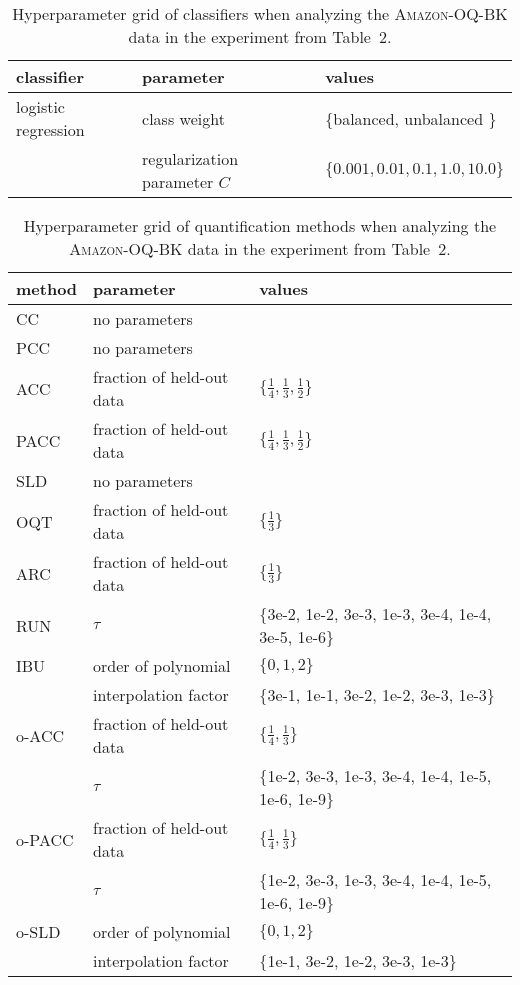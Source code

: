 \documentclass[10pt,a4paper]{article}
\begin{document}
\begin{table}
 \centering
 \caption{Hyperparameter grid of classifiers when analyzing the
 \textsc{Amazon-OQ-BK} data in the experiment from Table~2.}
 \label{tab:hyperparameter-roberta-classifier}
 \footnotesize
 \begin{tabular}{lll}
 \toprule
 classifier & parameter & values \\
 \midrule
 logistic regression & class weight & \{balanced, unbalanced \} \\
 & regularization parameter $C$ & $\{0.001, 0.01, 0.1, 1.0, 10.0\}$ \\
 \bottomrule
 \end{tabular}
\end{table}

\begin{table}
 \centering
 \caption{Hyperparameter grid of quantification methods when
 analyzing the \textsc{Amazon-OQ-BK} data in the experiment from
 Table~2.}
 \label{tab:hyperparameter-roberta-quantifier}
 \footnotesize
 \begin{tabular}{lll}
 \toprule
 method & parameter & values \\
 \midrule
 CC & no parameters & \\
 PCC & no parameters & \\
 ACC & fraction of held-out data & $\{\frac{1}{4}, \frac{1}{3}, \frac{1}{2}\}$ \\
 PACC & fraction of held-out data & $\{\frac{1}{4}, \frac{1}{3}, \frac{1}{2}\}$ \\
 SLD & no parameters & \\
 \midrule
 OQT & fraction of held-out data & $\{\frac{1}{3}\}$ \\
 ARC & fraction of held-out data & $\{\frac{1}{3}\}$ \\
 RUN & $\tau$ & $\{$3e-2, 1e-2, 3e-3, 1e-3, 3e-4, 1e-4, 3e-5, 1e-6$\}$ \\
 IBU & order of polynomial & $\{0, 1, 2\}$ \\
 & interpolation factor & $\{$3e-1, 1e-1, 3e-2, 1e-2, 3e-3, 1e-3$\}$ \\
 \midrule
 o-ACC & fraction of held-out data & $\{\frac{1}{4}, \frac{1}{3}\}$ \\
 & $\tau$ & $\{$1e-2, 3e-3, 1e-3, 3e-4, 1e-4, 1e-5, 1e-6, 1e-9$\}$ \\
 o-PACC & fraction of held-out data & $\{\frac{1}{4}, \frac{1}{3}\}$ \\
 & $\tau$ & $\{$1e-2, 3e-3, 1e-3, 3e-4, 1e-4, 1e-5, 1e-6, 1e-9$\}$ \\
 o-SLD & order of polynomial & $\{0, 1, 2\}$ \\
 & interpolation factor & $\{$1e-1, 3e-2, 1e-2, 3e-3, 1e-3$\}$ \\
 \bottomrule
 \end{tabular}
\end{table}
\end{document}
